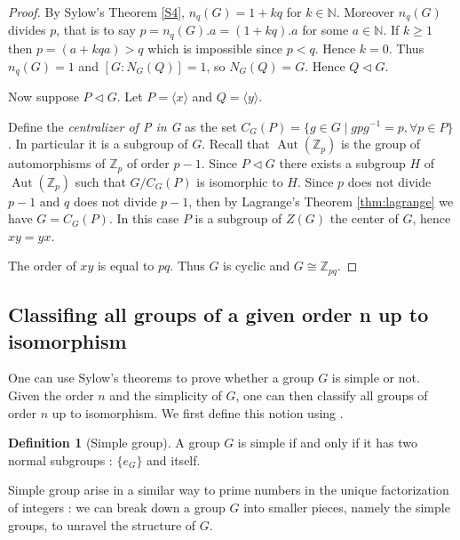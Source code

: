 \documentclass{article}
\theoremstyle{definition}
\theoremstyle{plain}
\theoremstyle{plain}
\theoremstyle{plain}
\theoremstyle{plain}
\theoremstyle{definition}
\newtheorem{defeng}[subsubsection]{Definition}
\theoremstyle{plain}
\theoremstyle{plain}
\DeclareMathOperator{\Aut}{Aut} %
\begin{document}
\begin{proof}
	By Sylow's Theorem \ref{S4}, \( n_q(G) = 1 + kq \) for \( k \in \mathbb{N} \). Moreover \( n_q(G) \) divides \( p \), that is to say \( p = n_q(G).a = (1 + kq). a \) for some \( a \in \mathbb{N} \). 
	If \( k \geq 1 \) then \( p = (a + kqa) > q \) which is impossible since \( p < q \).
	Hence \( k = 0 \).
	Thus \( n_q(G) = 1 \) and \( [G : N_G(Q)] = 1 \), so \( N_G(Q) = G \).
	Hence \( Q \triangleleft G \). 

	Now suppose \( P \triangleleft G \). Let \( P = \langle x \rangle \) and \( Q = \langle y \rangle \).

	Define the \textit{centralizer of P in G} as the set \( C_G(P) = \{ g \in G \mid gpg^{-1} = p, \forall p \in P\} \). In particular it is a subgroup of \( G \). Recall that \( \Aut({\mathbb{Z}_{p}}) \) is the group of automorphisms of \( \mathbb{Z}_{p} \) of order \( p-1 \).
	Since \( P \triangleleft G \) there exists a subgroup \( H \) of \( \Aut({\mathbb{Z}_{p}}) \) such that \( G/C_G(P) \) is isomorphic to \( H \). Since \( p \) does not divide \( p-1 \) and \( q \) does not divide \( p-1 \), then by Lagrange's Theorem \ref{thm:lagrange} we have \( G = C_G(P) \). In this case \( P \) is a subgroup of \( Z(G)\) the center of \( G \), hence \( xy = yx \). 

	The order of \( xy \) is equal to \( pq \). Thus \( G \) is cyclic and \( G \cong \mathbb{Z}_{pq} \).
\end{proof}

\subsection{Classifing all groups of a given order n up to isomorphism}

\par One can use Sylow's theorems to prove whether a group \( G \) is simple or not. Given the order \( n \) and the simplicity of \( G \), one can then classify all groups of order \( n \) up to isomorphism. We first define this notion using \cite[p.~103]{dummit2003abstract}.


\begin{defeng}[Simple group]
	A group \( G \) is simple if and only if it has two normal subgroups : 
	\( \{e_G\} \) and itself.
\end{defeng}

\par Simple group arise in a similar way to prime numbers in the unique factorization of integers : we can break down a group \( G \) into smaller pieces, namely the simple groups, to unravel the structure of \( G \).
\end{document}
